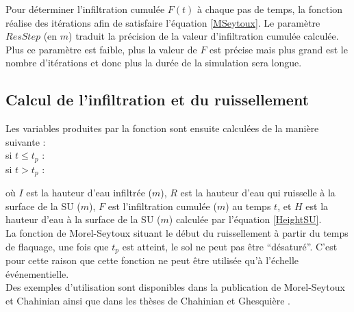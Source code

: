 Pour déterminer l'infiltration cumulée $F(t)$ à chaque pas de temps, la fonction réalise des itérations afin de satisfaire l'équation \ref{MSeytoux}. Le paramètre $ResStep$ (en $m$) traduit la précision de la valeur d'infiltration cumulée calculée. Plus ce paramètre est faible, plus la valeur de $F$ est précise mais plus grand est le nombre d'itérations et donc plus la durée de la simulation sera longue.


\subsection{Calcul de l'infiltration et du ruissellement}
Les variables produites par la fonction sont ensuite calculées de la manière suivante :\\

\hspace{-0.53cm} si $t \le t_p$ : \ \ \ \\
\vspace{-0.5mm}
si $t > t_p$ : \ \ \ 

où $I$ est la hauteur d'eau infiltrée ($m$), $R$ est la hauteur d'eau qui ruisselle à la surface de la SU ($m$), $F$ est l'infiltration cumulée ($m$) au temps $t$, et $H$ est la hauteur d'eau à la surface de la SU ($m$) calculée par l'équation \ref{HeightSU}.\\

La fonction de Morel-Seytoux situant le début du ruissellement à partir du temps de flaquage, une fois que $t_p$ est atteint, le sol ne peut pas être ``désaturé''. C'est pour cette raison que cette fonction ne peut être utilisée qu'à l'échelle événementielle.\\

Des exemples d'utilisation sont disponibles dans la publication de Morel-Seytoux \cite{MorelS1984} et Chahinian \cite{Chahinian2004b} ainsi que dans les thèses de Chahinian \cite{Chahinian2004} et Ghesquière \cite{Ghesquiere2008}.
